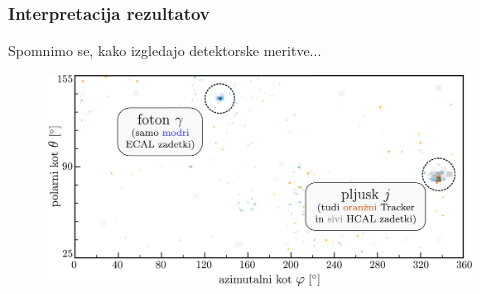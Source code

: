 \documentclass[14pt, t]{beamer}
\begin{document}
\begin{frame}
    \frametitle{Interpretacija rezultatov}
    Spomnimo se, kako izgledajo detektorske meritve...
    \begin{figure}[htb!]
        \centering
        \includegraphics[width=\linewidth]{raster/raster-svg-slo/event-image.pdf}
    \end{figure}
\end{frame}
\end{document}
